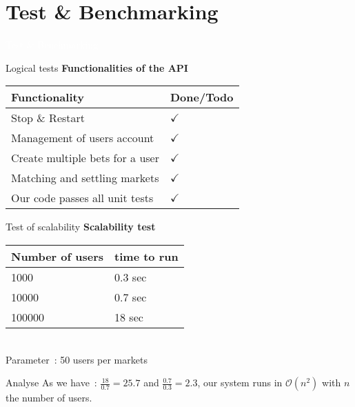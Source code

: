 \documentclass{beamer}
\begin{document}
\section*{Test \& Benchmarking}
\begin{frame}{}
    \centering
    \begin{cadre}
        \textcolor{white}{
            Test \& Benchmarking 
        }
    \end{cadre}
\end{frame}

\begin{frame}{Logical tests}
    \centering
    \textbf{Functionalities of the API}\\
    \begin{tabular}{|l|l|}
        \hline Functionality & Done/Todo \\
        \hline Stop \& Restart & \(\checkmark\) \\
        \hline Management of users account & \(\checkmark\) \\
        \hline Create multiple bets for a user & \(\checkmark\) \\
        \hline Matching and settling markets & \(\checkmark\) \\
        \hline Our code passes all unit tests & \(\checkmark\) \\
        \hline
    \end{tabular}
\end{frame}

\begin{frame}{Test of scalability}
    \centering
    \textbf{Scalability test}\\
    \begin{tabular}{|l|l|}
        \hline Number of users & time to run \\
        \hline 1000            & 0.3 sec\\
        \hline 10000           & 0.7 sec\\
        \hline 100000          & 18  sec\\
        \hline
    \end{tabular}\\
    Parameter~: 50 users per markets
    \begin{alertblock}{Analyse}
        As we have~: \(\frac{18}{0.7} = 25.7\) and \(\frac{0.7}{0.3} = 2.3\),
        our system runs in \(\mathcal{O}(n^2)\) with \(n\) the number of users.
    \end{alertblock}
\end{frame}
\end{document}
